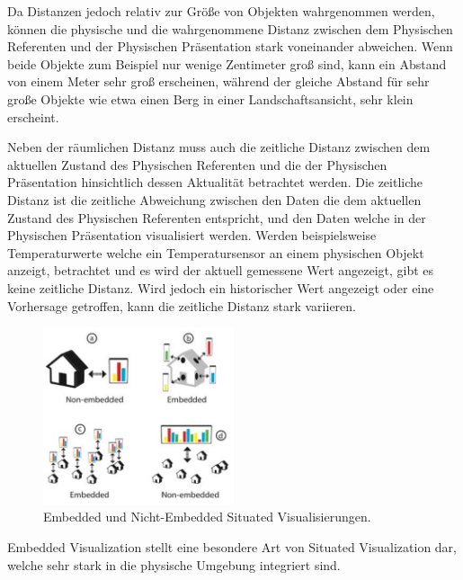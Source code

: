 \cite[S.~194]{Marriott2018} Da Distanzen jedoch relativ zur Größe von Objekten wahrgenommen werden, können die physische und die wahrgenommene Distanz zwischen dem Physischen Referenten und der Physischen Präsentation stark voneinander abweichen. Wenn beide Objekte zum Beispiel nur wenige Zentimeter groß sind, kann ein Abstand von einem Meter sehr groß erscheinen, während der gleiche Abstand für sehr große Objekte wie etwa einen Berg in einer Landschaftsansicht, sehr klein erscheint.


\cite{Willett2017} Neben der räumlichen Distanz muss auch die zeitliche Distanz zwischen dem aktuellen Zustand des Physischen Referenten und die der Physischen Präsentation hinsichtlich dessen 
Aktualität betrachtet werden. 
Die zeitliche Distanz ist die zeitliche Abweichung zwischen den Daten die dem aktuellen Zustand des Physischen Referenten entspricht, und den Daten welche in der Physischen Präsentation visualisiert werden.
Werden beispielsweise Temperaturwerte welche ein Temperatursensor an einem physischen Objekt anzeigt, betrachtet und es wird der aktuell gemessene Wert angezeigt, gibt es keine zeitliche Distanz. Wird jedoch ein
historischer Wert angezeigt oder eine Vorhersage getroffen, kann die zeitliche Distanz stark variieren.

\begin{figure}[H]
	\centering
	\includegraphics[width=0.5\textwidth]{resources/fundamentals/situated_visualization/embedded_visualization.png}
	\caption{Embedded und Nicht-Embedded Situated Visualisierungen. \cite[S.~195]{Marriott2018}}
	\label{img:embedded_visualization}
\end{figure}

\cite[S.~195]{Marriott2018} Embedded Visualization stellt eine besondere Art von Situated Visualization dar, welche sehr stark in die physische Umgebung integriert sind. 

